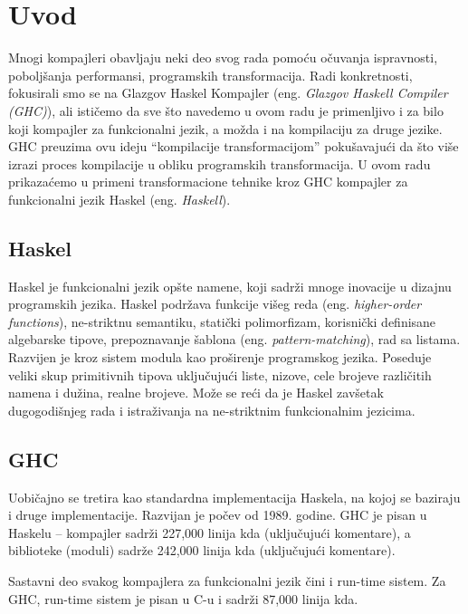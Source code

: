 \section{Uvod}
\label{sec:uvod}

Mnogi kompajleri obavljaju neki deo svog rada pomoću očuvanja ispravnosti, poboljšanja performansi, programskih transformacija. Radi konkretnosti, fokusirali smo se na Glazgov Haskel Kompajler (eng. \emph{Glazgov Haskell Compiler (GHC)}), ali ističemo da sve što navedemo u ovom radu je primenljivo i za bilo koji kompajler za funkcionalni jezik, a možda i
na kompilaciju za druge jezike. GHC preuzima ovu ideju “kompilacije transformacijom” pokušavajući da što više izrazi proces kompilacije u obliku programskih transformacija. U ovom radu prikazaćemo u primeni transformacione tehnike kroz GHC kompajler za funkcionalni jezik Haskel (eng. \emph{Haskell}).

\subsection{Haskel}
\label{subsec:podnaslovHaskel}
Haskel je funkcionalni jezik opšte namene, koji sadrži mnoge inovacije u dizajnu programskih jezika. Haskel podržava funkcije višeg reda (eng.\emph{ higher-order functions}), ne-striktnu semantiku, statički polimorfizam, korisnički definisane algebarske tipove, prepoznavanje šablona (eng. \emph{ pattern-matching}), rad sa listama. Razvijen je kroz sistem modula kao proširenje programskog jezika. Poseduje veliki skup primitivnih tipova uključujući liste, nizove, cele brojeve različitih namena i dužina, realne brojeve. Može se reći da je Haskel zavšetak dugogodišnjeg rada i istraživanja na ne-striktnim funkcionalnim jezicima. 

\subsection{GHC}
\label{subsec:podnaslovGHC}

Uobičajno se tretira kao standardna implementacija Haskela, na kojoj se baziraju i druge implementacije. Razvijan je počev od 1989. godine. GHC je pisan u Haskelu – kompajler sadrži 227,000 linija kda (uključujući komentare), a biblioteke (moduli) sadrže 242,000 linija kda (uključujući komentare).

Sastavni deo svakog kompajlera za funkcionalni jezik čini i run-time sistem. Za GHC, run-time sistem je pisan u C-u i sadrži 87,000 linija kda.

